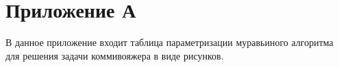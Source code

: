 \chapter*{Приложение А}
В данное приложение входит таблица параметризации муравьиного алгоритма для решения задачи коммивояжера в виде рисунков.

